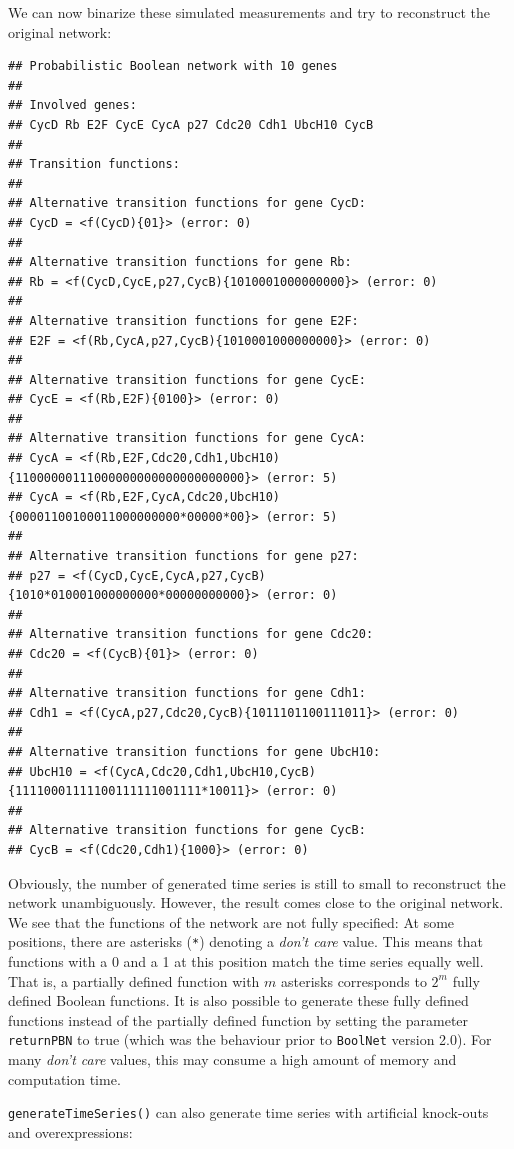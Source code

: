 \documentclass[a4paper]{article}
\begin{document}
We can now binarize these simulated measurements and try to reconstruct the original network:
\begin{knitrout}
\color{fgcolor}\begin{kframe}
\begin{alltt}
 \hlkwb{<-}  \hlstd{=}\hlstd{)}
 \hlkwb{<-} \hlopt{$} \hlstd{=}\hlstd{)}
\end{alltt}
\begin{verbatim}
## Probabilistic Boolean network with 10 genes
## 
## Involved genes:
## CycD Rb E2F CycE CycA p27 Cdc20 Cdh1 UbcH10 CycB
## 
## Transition functions:
## 
## Alternative transition functions for gene CycD:
## CycD = <f(CycD){01}> (error: 0)
## 
## Alternative transition functions for gene Rb:
## Rb = <f(CycD,CycE,p27,CycB){1010001000000000}> (error: 0)
## 
## Alternative transition functions for gene E2F:
## E2F = <f(Rb,CycA,p27,CycB){1010001000000000}> (error: 0)
## 
## Alternative transition functions for gene CycE:
## CycE = <f(Rb,E2F){0100}> (error: 0)
## 
## Alternative transition functions for gene CycA:
## CycA = <f(Rb,E2F,Cdc20,Cdh1,UbcH10){11000000111000000000000000000000}> (error: 5)
## CycA = <f(Rb,E2F,CycA,Cdc20,UbcH10){00001100100011000000000*00000*00}> (error: 5)
## 
## Alternative transition functions for gene p27:
## p27 = <f(CycD,CycE,CycA,p27,CycB){1010*010001000000000*00000000000}> (error: 0)
## 
## Alternative transition functions for gene Cdc20:
## Cdc20 = <f(CycB){01}> (error: 0)
## 
## Alternative transition functions for gene Cdh1:
## Cdh1 = <f(CycA,p27,Cdc20,CycB){1011101100111011}> (error: 0)
## 
## Alternative transition functions for gene UbcH10:
## UbcH10 = <f(CycA,Cdc20,Cdh1,UbcH10,CycB){11110001111100111111001111*10011}> (error: 0)
## 
## Alternative transition functions for gene CycB:
## CycB = <f(Cdc20,Cdh1){1000}> (error: 0)
\end{verbatim}
\end{kframe}
\end{knitrout}

Obviously, the number of generated time series is still to small to reconstruct the network unambiguously. However, the result comes close to the original network. We see that the functions of the network are not fully specified: At some positions, there are asterisks (\texttt{*}) denoting a \emph{don't care} value. This means that functions with a 0 and a 1 at this position match the time series equally well. That is, a partially defined function with $m$ asterisks corresponds to $2^m$ fully defined Boolean functions. It is also possible to generate these fully defined functions instead of the partially defined function by setting the parameter \texttt{returnPBN} to true (which was the behaviour prior to \texttt{BoolNet} version 2.0). For many \emph{don't care} values, this may consume a high amount of memory and computation time. 

\texttt{generateTimeSeries()} can also generate time series with artificial knock-outs and overexpressions:
\end{document}
